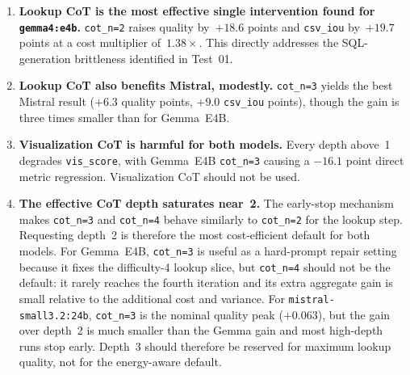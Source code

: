 \begin{enumerate}
    \item \textbf{Lookup CoT is the most effective single intervention
          found for \texttt{gemma4:e4b}.} \texttt{cot\_n=2} raises
          quality by~$+18.6$ points and \texttt{csv\_iou} by~$+19.7$
          points at a cost multiplier of~$1.38\times$. This directly
          addresses the SQL-generation brittleness identified in Test~01.

    \item \textbf{Lookup CoT also benefits Mistral, modestly.}
          \texttt{cot\_n=3} yields the best Mistral result ($+6.3$
          quality points, $+9.0$ \texttt{csv\_iou} points), though the
          gain is three times smaller than for Gemma~E4B.

    \item \textbf{Visualization CoT is harmful for both models.}
          Every depth above~1 degrades \texttt{vis\_score}, with
          Gemma~E4B \texttt{cot\_n=3} causing a $-16.1$ point direct
          metric regression. Visualization CoT should not be used.

    \item \textbf{The effective CoT depth saturates near~2.} The
          early-stop mechanism makes \texttt{cot\_n=3} and
          \texttt{cot\_n=4} behave similarly to \texttt{cot\_n=2} for
          the lookup step. Requesting depth~2 is therefore the most
          cost-efficient default for both models. For Gemma~E4B,
          \texttt{cot\_n=3} is useful as a hard-prompt repair setting
          because it fixes the difficulty-4 lookup slice, but
          \texttt{cot\_n=4} should not be the default: it rarely reaches
          the fourth iteration and its extra aggregate gain is small
          relative to the additional cost and variance. For
          \texttt{mistral-\allowbreak small3.2:24b}, \texttt{cot\_n=3} is the nominal
          quality peak ($+0.063$), but the gain over depth~2 is much
          smaller than the Gemma gain and most high-depth runs stop early.
          Depth~3 should therefore be reserved for maximum lookup quality,
          not for the energy-aware default.


\end{enumerate}
